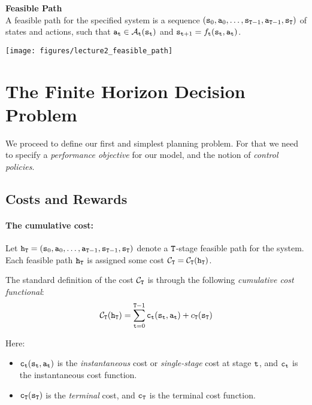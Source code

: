 \begin{definition}{\textbf{Feasible Path}} \\
A feasible path for the specified system is a sequence
$({{\tt s}_0},{{\tt a}_0}, \ldots ,{{\tt s}_{{\tt T} -
1}},{{\tt a}_{{\tt T} - 1}},{{\tt s}_{\tt T}})$ of states and
actions, such that ${{\tt a}_{{\tt t}}} \in
{\mathcal{A}_{{\tt t}}}({{\tt s}_{{\tt t}}})$ and ${{\tt s}_{{\tt t} + 1}} =
{f_{{\tt t}}}({{\tt s}_{{\tt t}}},{{\tt a}_{{\tt t}}})$.

\bigskip

\begin{centering}
\texttt{[image: figures/lecture2\_feasible\_path]}\\
\end{centering}
\end{definition}

\section{The Finite Horizon Decision Problem}

We proceed to define our first and simplest planning problem. For
that we need to specify a \emph{performance objective} for our
model, and the notion of \emph{control policies}.

\subsection{Costs and Rewards}

\paragraph{The cumulative cost:}
Let ${{\tt h}_{\tt T}} = ({{\tt s}_0},{{\tt a}_0}, \ldots
,{{\tt a}_{{\tt T} - 1}},{{\tt s}_{{\tt T} -
1}},{{\tt s}_{\tt T}})$ denote a ${\tt T}$-stage feasible path
for the system. Each feasible path ${{\tt h}_{\tt T}}$ is assigned
some cost ${\mathcal{C}_{\tt T}} =
{\mathcal{C}_{\tt T}}({{\tt h}_{\tt T}})$.

The standard definition of the cost ${\mathcal{C}_{\tt T}}$ is through
the following \emph{cumulative cost functional}:
\[{\mathcal{C}_{\tt T}}({{\tt h}_{\tt T}}) = \sum_{{\tt t} = 0}^{{\tt T} - 1} {{{\tt c}_{{\tt t}}}({{\tt s}_{{\tt t}}},{{\tt a}_{{\tt t}}}) + {c_{\tt T}}({{\tt s}_{\tt T}})} \]

Here:
    \begin{itemize}
    \item
${{\tt c}_{{\tt t}}}({{\tt s}_{{\tt t}}},{{\tt a}_{{\tt t}}})$ is the
\emph{instantaneous}  cost or \emph{single-stage }cost at stage
${\tt t}$, and ${{\tt c}_{{\tt t}}}$ is the instantaneous cost function.
    \item
${{\tt c}_{\tt T}}({{\tt s}_{\tt T}})$ is the \emph{terminal} cost,
and ${{\tt c}_{\tt T}}$ is the terminal cost function.
  \end{itemize}

